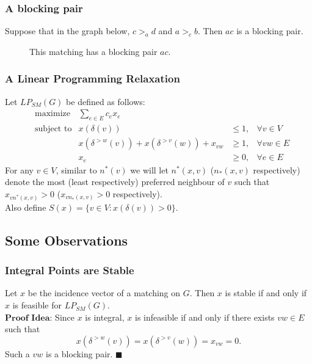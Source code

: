 \documentclass{beamer}
\begin{document}
\begin{frame}
\frametitle{A blocking pair}
Suppose that in the graph below, $c >_a d$ and $a >_c b$. Then $ac$ is a blocking pair.
\begin{figure}
\centering
{}
\caption{This matching has a blocking pair $ac$.}
\end{figure}
\end{frame}

\begin{frame}
\frametitle{A Linear Programming Relaxation}
Let $LP_{SM}(G)$ be defined as follows:
\begin{align*}
&\text{maximize} &\sum_{e \in E} c_e x_e \\
&\text{subject to} &x(\delta(v)) &\leq 1, &\forall v \in V\\
& &x(\delta^{>w}(v)) + x(\delta^{>v}(w)) + x_{vw} &\geq 1, &\forall vw \in E\\
& &x_e &\geq 0, &\forall e \in E
\end{align*}
For any $v \in V$, similar to $n^*(v)$ we will let $n^*(x,v)$ ($n_*(x,v)$ respectively) denote the most (least respectively) preferred neighbour of $v$ such that $x_{vn^*(x,v)} > 0$ ($x_{vn_*(x,v)} > 0$ respectively). \\
Also define $S(x) = \{ v \in V : x(\delta(v)) > 0 \}$.
\end{frame}

\subsection{Some Observations}
\begin{frame}
\frametitle{Integral Points are Stable}
Let $x$ be the incidence vector of a matching on $G$. Then $x$ is stable if and only if $x$ is feasible for $LP_{SM}(G)$.\\
$\textbf{Proof Idea:}$ Since $x$ is integral, $x$ is infeasible if and only if there exists $vw \in E$ such that $$ x(\delta^{>w}(v)) = x(\delta^{>v}(w)) = x_{vw} = 0. $$
Such a $vw$ is a blocking pair. $\blacksquare$
\end{frame}
\end{document}
